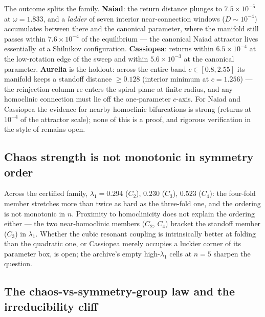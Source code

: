 \documentclass[11pt]{article}
\begin{document}
The outcome splits the family. \textbf{Naiad}: the return distance
plunges to $7.5\times10^{-5}$ at $\omega = 1.833$, and a \emph{ladder} of
seven interior near-connection windows ($D \sim 10^{-4}$) accumulates
between there and the canonical parameter, where the manifold still
passes within $7.6\times10^{-4}$ of the equilibrium --- the canonical
Naiad attractor lives essentially \emph{at} a Shilnikov configuration.
\textbf{Cassiopea}: returns within $6.5\times10^{-4}$ at the low-rotation
edge of the sweep and within $5.6\times10^{-3}$ at the canonical
parameter. \textbf{Aurelia} is the holdout: across the entire band
$c \in [0.8, 2.55]$ its manifold keeps a standoff distance
$\ge 0.128$ (interior minimum at $c=1.256$) --- the reinjection column
re-enters the spiral plane at finite radius, and any homoclinic
connection must lie off the one-parameter $c$-axis. For Naiad and
Cassiopea the evidence for nearby homoclinic bifurcations is strong
(returns at $10^{-4}$ of the attractor scale); none of this is a proof,
and rigorous verification in the style of \citet{tucker2002} remains
open.

\subsection{Chaos strength is not monotonic in symmetry order}\label{sec:nonmonotonic}

Across the certified family, $\lambda_1 = 0.294$ ($C_2$), $0.230$
($C_3$), $0.523$ ($C_4$): the four-fold member stretches more than twice
as hard as the three-fold one, and the ordering is not monotonic in $n$.
Proximity to homoclinicity does not explain the ordering either --- the
two near-homoclinic members ($C_2$, $C_4$) bracket the standoff member
($C_3$) in $\lambda_1$. Whether the cubic resonant coupling is
intrinsically better at folding than the quadratic one, or Cassiopea
merely occupies a luckier corner of its parameter box, is open; the
archive's empty high-$\lambda_1$ cells at $n=5$ sharpen the question.

\subsection{The chaos-vs-symmetry-group law and the irreducibility
cliff}\label{sec:law}
\end{document}
